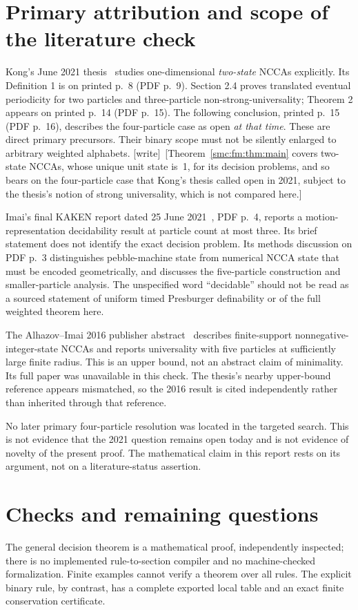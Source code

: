 \documentclass[11pt,letterpaper]{article}
\numberwithin{equation}{section}
\theoremstyle{definition}
\theoremstyle{remark}
\newcommand{\wtag}{\textup{[write]}}
\begin{document}
\section{Primary attribution and scope of the literature check}\label{smc:fm:sec:attribution}
Kong's June 2021 thesis~\cite{kongthesis} studies one-dimensional \emph{two-state}
NCCAs explicitly. Its Definition 1 is on printed p.~8 (PDF p.~9).
Section 2.4 proves translated eventual periodicity for two particles and
three-particle non-strong-universality; Theorem 2 appears on printed p.~14
(PDF p.~15). The following conclusion, printed p.~15 (PDF p.~16), describes
the four-particle case as open \emph{at that time}. These are direct primary
precursors. Their binary scope must not be silently enlarged to arbitrary
weighted alphabets. \wtag\ [Theorem~\ref{smc:fm:thm:main} covers two-state NCCAs, whose unique unit state is~1, for its decision problems, and so bears on the four-particle case that Kong's thesis called open in 2021, subject to the thesis's notion of strong universality, which is not compared here.]

Imai's final KAKEN report dated 25 June 2021~\cite{kakenfinal}, PDF p.~4,
reports a motion-representation decidability result at particle count at most
three. Its brief statement does not identify the exact decision problem.
Its methods discussion on PDF p.~3 distinguishes pebble-machine state from
numerical NCCA state that must be encoded geometrically, and discusses the
five-particle construction and smaller-particle analysis. The unspecified
word ``decidable'' should not be read as a sourced statement of uniform timed
Presburger definability or of the full weighted theorem here.

The Alhazov--Imai 2016 publisher abstract~\cite{alhazovimai} describes
finite-support nonnegative-integer-state NCCAs and reports universality with
five particles at sufficiently large finite radius. This is an upper bound,
not an abstract claim of minimality. Its full paper was unavailable in this
check. The thesis's nearby upper-bound reference appears mismatched, so the
2016 result is cited independently rather than inherited through that reference.

No later primary four-particle resolution was located in the targeted search.
This is not evidence that the 2021 question remains open today and is not
evidence of novelty of the present proof. The mathematical claim in this report
rests on its argument, not on a literature-status assertion.

\section{Checks and remaining questions}\label{smc:fm:sec:checks}
The general decision theorem is a mathematical proof, independently inspected;
there is no implemented rule-to-section compiler and no machine-checked
formalization. Finite examples cannot verify a theorem over all rules.
The explicit binary rule, by contrast, has a complete exported local table
and an exact finite conservation certificate.
\end{document}
